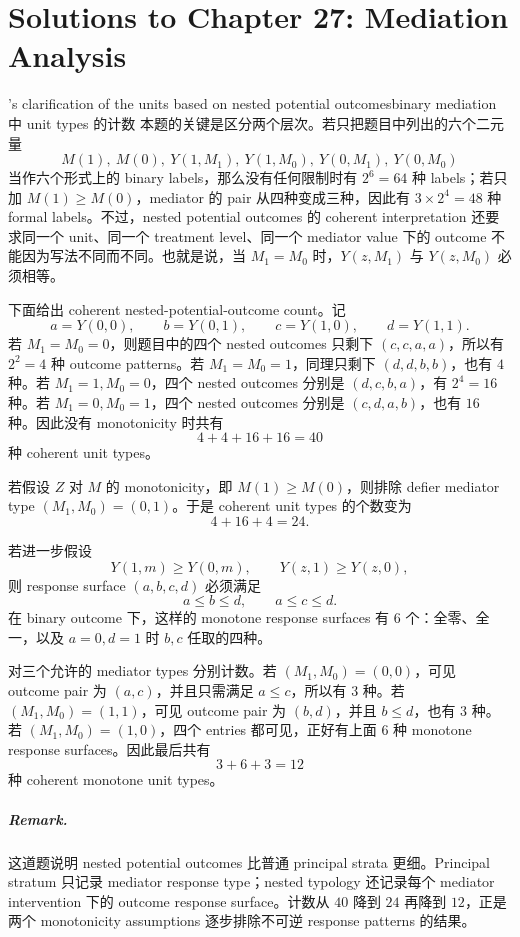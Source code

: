 \chapter{Solutions to Chapter 27: Mediation Analysis}
\label{sol:chapter27}

\begin{exercisesolution}{\citet{Robins::1992}'s clarification of the units based on nested potential outcomes}{binary mediation 中 unit types 的计数}
本题的关键是区分两个层次。若只把题目中列出的六个二元量
\[
M(1),\ M(0),\ Y(1,M_1),\ Y(1,M_0),\ Y(0,M_1),\ Y(0,M_0)
\]
当作六个形式上的 binary labels，那么没有任何限制时有 $2^6=64$ 种 labels；若只加 $M(1)\geq M(0)$，mediator 的 pair 从四种变成三种，因此有 $3\times 2^4=48$ 种 formal labels。不过，nested potential outcomes 的 coherent interpretation 还要求同一个 unit、同一个 treatment level、同一个 mediator value 下的 outcome 不能因为写法不同而不同。也就是说，当 $M_1=M_0$ 时，$Y(z,M_1)$ 与 $Y(z,M_0)$ 必须相等。

下面给出 coherent nested-potential-outcome count。记
\[
a=Y(0,0),\qquad b=Y(0,1),\qquad c=Y(1,0),\qquad d=Y(1,1).
\]
若 $M_1=M_0=0$，则题目中的四个 nested outcomes 只剩下 $(c,c,a,a)$，所以有 $2^2=4$ 种 outcome patterns。若 $M_1=M_0=1$，同理只剩下 $(d,d,b,b)$，也有 $4$ 种。若 $M_1=1,M_0=0$，四个 nested outcomes 分别是 $(d,c,b,a)$，有 $2^4=16$ 种。若 $M_1=0,M_0=1$，四个 nested outcomes 分别是 $(c,d,a,b)$，也有 $16$ 种。因此没有 monotonicity 时共有
\[
4+4+16+16=40
\]
种 coherent unit types。

若假设 $Z$ 对 $M$ 的 monotonicity，即 $M(1)\geq M(0)$，则排除 defier mediator type $(M_1,M_0)=(0,1)$。于是 coherent unit types 的个数变为
\[
4+16+4=24.
\]

若进一步假设
\[
Y(1,m)\geq Y(0,m),\qquad Y(z,1)\geq Y(z,0),
\]
则 response surface $(a,b,c,d)$ 必须满足
\[
a\leq b\leq d,\qquad a\leq c\leq d.
\]
在 binary outcome 下，这样的 monotone response surfaces 有 $6$ 个：全零、全一，以及 $a=0,d=1$ 时 $b,c$ 任取的四种。

对三个允许的 mediator types 分别计数。若 $(M_1,M_0)=(0,0)$，可见 outcome pair 为 $(a,c)$，并且只需满足 $a\leq c$，所以有 $3$ 种。若 $(M_1,M_0)=(1,1)$，可见 outcome pair 为 $(b,d)$，并且 $b\leq d$，也有 $3$ 种。若 $(M_1,M_0)=(1,0)$，四个 entries 都可见，正好有上面 $6$ 种 monotone response surfaces。因此最后共有
\[
3+6+3=12
\]
种 coherent monotone unit types。

\paragraph{Remark.}
这道题说明 nested potential outcomes 比普通 principal strata 更细。Principal stratum 只记录 mediator response type；nested typology 还记录每个 mediator intervention 下的 outcome response surface。计数从 $40$ 降到 $24$ 再降到 $12$，正是两个 monotonicity assumptions 逐步排除不可逆 response patterns 的结果。
\end{exercisesolution}


